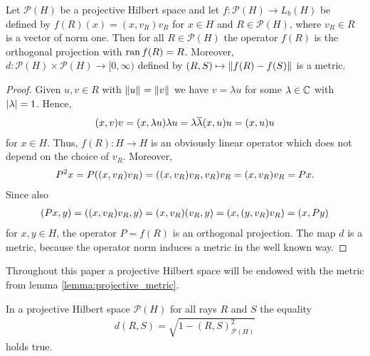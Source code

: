 \begin{lemma} \label{lemma:projective_metric}
	Let $\mathcal{P}(H)$ be a projective Hilbert space and let $f: \mathcal{P}(H) \to L_b(H)$ be defined by $f(R)(x) = (x,v_R)v_R$ for $x \in H$ and $R \in \mathcal{P}(H)$, where $v_R \in R$ is a vector of norm one. Then for all $R \in \mathcal{P}(H)$ the operator $f(R)$ is the orthogonal projection with $\operatorname{ran} f(R) = R$. Moreover, $d: \mathcal{P}(H) \times \mathcal{P}(H) \to [0, \infty)$ defined by $(R,S) \mapsto {\left \| f(R) - f(S) \right \|}_{}$ is a metric. 
\end{lemma}

\begin{proof}
	Given $u,v \in R$ with ${\left \| u \right \|}_{} = {\left \| v \right \|}_{}$ we have $v = \lambda u$ for some $\lambda \in \mathbb{C}$ with ${\left | \lambda \right |} = 1$. Hence,
	\begin{align*}
		{\left ( x,v \right )}v = {\left ( x, \lambda u \right )} \lambda u = \lambda \overline{\lambda} {\left ( x, u \right )} u = {\left ( x, u \right )} u 
	\end{align*}
	for $x \in H$. Thus, $f(R): H \to H$ is an obviously linear operator which does not depend on the choice of $v_R$. Moreover,
	\begin{align*}
		P^2x = P{\left ( (x, v_R) v_R \right )} = {\left ( (x, v_R) v_R, v_R \right )} v_R = (x,v_R) v_R = Px.
	\end{align*}
	Since also
	\begin{align*}
		(Px, y) = {\left ( (x, v_R) v_R, y \right )} = (x, v_R) (v_R, y) = {\left ( x, (y, v_R) v_R \right )} = (x, Py)
	\end{align*}
	for $x,y \in H$, the operator $P = f(R)$ is an orthogonal projection. The map $d$ is a metric, because the operator norm induces a metric in the well known way. 
\end{proof}


\begin{remark}
	Throughout this paper a projective Hilbert space will be endowed with the metric from lemma \ref{lemma:projective_metric}. 
\end{remark}


\begin{lemma} \label{lemma:metric_representation}
	In a projective Hilbert space $\mathcal{P}(H)$ for all rays $R$ and $S$ the equality 
	\begin{align*}
		d(R,S) = \sqrt{1 - (R,S)_{\mathcal{P}(H)}^2}
	\end{align*}
	holds true.
\end{lemma}

